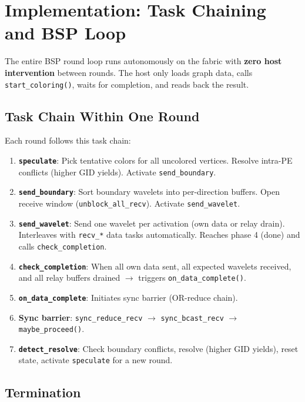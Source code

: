 \documentclass[11pt,letterpaper]{article}
\begin{document}
\section{Implementation: Task Chaining and BSP Loop}
\label{sec:task-chain}

The entire BSP round loop runs autonomously on the fabric with \textbf{zero host intervention} between rounds. The host only loads graph data, calls \texttt{start\_coloring()}, waits for completion, and reads back the result.

\subsection{Task Chain Within One Round}

Each round follows this task chain:

\begin{enumerate}[nosep]
  \item \textbf{\texttt{speculate}}: Pick tentative colors for all uncolored vertices. Resolve intra-PE conflicts (higher GID yields). Activate \texttt{send\_boundary}.
  \item \textbf{\texttt{send\_boundary}}: Sort boundary wavelets into per-direction buffers. Open receive window (\texttt{unblock\_all\_recv}). Activate \texttt{send\_wavelet}.
  \item \textbf{\texttt{send\_wavelet}}: Send one wavelet per activation (own data or relay drain). Interleaves with \texttt{recv\_*} data tasks automatically. Reaches phase 4 (done) and calls \texttt{check\_completion}.
  \item \textbf{\texttt{check\_completion}}: When all own data sent, all expected wavelets received, and all relay buffers drained $\to$ triggers \texttt{on\_data\_complete()}.
  \item \textbf{\texttt{on\_data\_complete}}: Initiates sync barrier (OR-reduce chain).
  \item \textbf{Sync barrier}: \texttt{sync\_reduce\_recv} $\to$ \texttt{sync\_bcast\_recv} $\to$ \texttt{maybe\_proceed()}.
  \item \textbf{\texttt{detect\_resolve}}: Check boundary conflicts, resolve (higher GID yields), reset state, activate \texttt{speculate} for a new round.
\end{enumerate}

\subsection{Termination}
\end{document}

